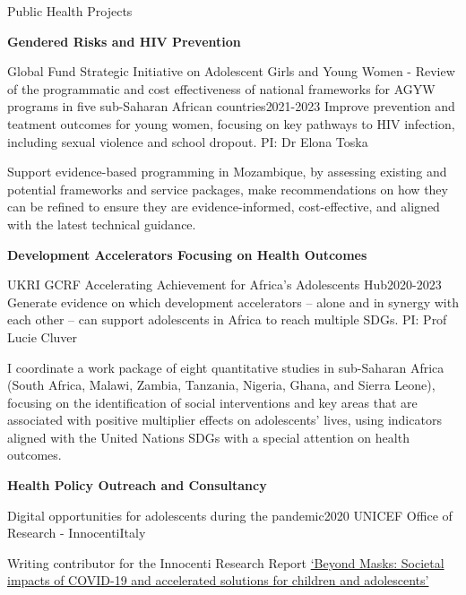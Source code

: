 \begin{rSection}{Public Health Projects}
\begin{etaremune}
\vspace{1em}

\item \textbf{Gendered Risks and HIV Prevention}

\begin{rSubsection}
{Global Fund Strategic Initiative on Adolescent Girls and Young Women - Review of the programmatic and cost effectiveness of national frameworks for AGYW programs in five sub-Saharan African countries}{2021-2023}
{Improve prevention and teatment outcomes for young women, focusing on key pathways to HIV infection, including sexual violence and school dropout. PI: Dr Elona Toska}\par
{Support evidence-based programming in Mozambique, by assessing existing and potential frameworks and service packages, make recommendations on how they can be refined to ensure they are evidence-informed, cost-effective, and aligned with the latest technical guidance.}
\end{rSubsection}

\vspace{1em}

\item \textbf{Development Accelerators Focusing on Health Outcomes}\par

\begin{rSubsection}
{UKRI GCRF Accelerating Achievement for Africa's Adolescents Hub}{2020-2023}
{Generate evidence on which development accelerators – alone and in synergy with each other – can support adolescents in Africa to reach multiple SDGs. PI: Prof Lucie Cluver}\par
{I coordinate a work package of eight quantitative studies in sub-Saharan Africa (South Africa, Malawi, Zambia, Tanzania, Nigeria, Ghana, and Sierra Leone), focusing on the identification of social interventions and key areas that are associated with positive multiplier effects on adolescents’ lives, using indicators aligned with the United Nations SDGs with a special attention on health outcomes.} 
\end{rSubsection}

\vspace{1em}

\item  \textbf{Health Policy Outreach and Consultancy}\par

\begin{rSubsection}
{Digital opportunities for adolescents during the pandemic}{2020}
{UNICEF Office of Research - Innocenti}{Italy}\par
{Writing contributor for the Innocenti Research Report \href{https://www.unicef-irc.org/publications/pdf/UNICEF-Beyond-Masks-Report-Societal-impacts-of-COVID-19.pdf}{‘Beyond Masks: Societal impacts of COVID-19 and accelerated solutions for children and adolescents'}}
\end{rSubsection}


\end{etaremune}
\end{rSection}
